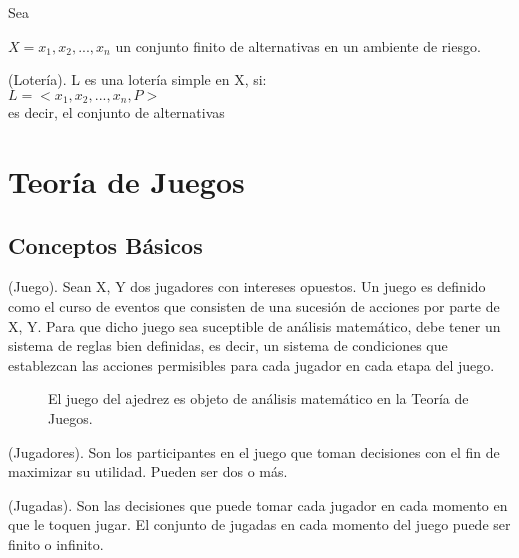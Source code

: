 Sea {$X={x_{1}, x_{2}, ..., x_{n}}$ un conjunto finito de alternativas en un ambiente de riesgo.

\begin{defn}(Lotería). L es una lotería simple en X, si:\\
	$L=<{x_{1}, x_{2}, ..., x_{n}}, P>$\\
es decir, el conjunto de alternativas 
\end{defn}





\section{Teoría de Juegos}

\subsection{Conceptos Básicos}

\begin{defn}(Juego). Sean X, Y dos jugadores con intereses opuestos. Un juego es definido como el curso de eventos que consisten de una sucesión de acciones por parte de X, Y. Para que dicho juego sea suceptible de análisis matemático, debe tener un sistema de reglas bien definidas, es decir, un sistema de condiciones que establezcan las acciones permisibles para cada jugador en cada etapa del juego. \cite{art}\\
\end{defn}	

\begin{figure}[h]
	\center
	\label{fig.juegodeajedrez}
		\newgame   %
	\showboard %
	\caption[Juego del Ajedrez]{El juego del ajedrez es objeto de análisis matemático en la Teoría de Juegos.}
\end{figure}


\begin{defn}(Jugadores). Son los participantes en el juego que toman decisiones con el fin de maximizar su utilidad. Pueden ser dos o más.
\end{defn}

\begin{defn}(Jugadas). Son las decisiones que puede tomar cada jugador en cada momento en que le toquen jugar. El conjunto de jugadas en cada momento del juego puede ser finito o infinito.
\end{defn}

}
